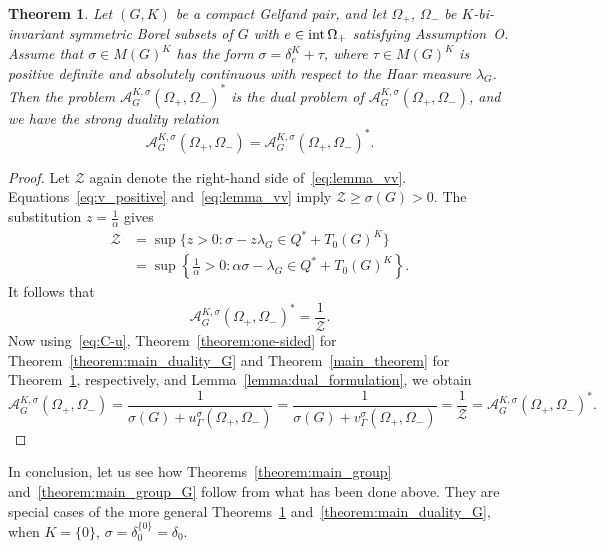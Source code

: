 \documentclass[[a4paper,english,12pt]{amsart}
\theoremstyle{plain}
\newtheorem{theorem}{Theorem}
\theoremstyle{remark}
\newcommand{\intt}{\mbox{\rm int\,}}
\begin{document}
\begin{theorem} \label{theorem:main_duality}
Let $(G,K)$ be a compact Gelfand pair, and let $\Omega_+$, $\Omega_-$ be $K$-bi-invariant symmetric Borel subsets of $G$ with $e \in \intt{\Omega_+}$ satisfying Assumption~O.  Assume that $\sigma\in M(G)^K$ has the form $\sigma = \delta_e^K + \tau $, where \(\tau \in M(G)^K\) is positive definite and absolutely continuous with respect to the Haar measure $\lambda_G$. Then the problem ${\mathcal{A}}^{K, \sigma}_G(\Omega_+, \Omega_-)^{*}$ is the dual problem of ${\mathcal{A}}^{K, \sigma}_G(\Omega_+, \Omega_-)$, and we have the strong duality relation
\begin{equation*}
   {\mathcal{A}}^{K, \sigma}_G(\Omega_+, \Omega_-) = {\mathcal{A}}^{K, \sigma}_G(\Omega_+, \Omega_-)^{*}.
\end{equation*}
\end{theorem}

\begin{proof} 
Let $\mathcal{Z}$ again denote the right-hand side of~\eqref{eq:lemma_vv}. Equations~\eqref{eq:v_positive} and~\eqref{eq:lemma_vv} imply $\mathcal{Z} \ge \sigma(G) > 0$. The substitution $z = \frac{1}{\alpha}$ gives
\begin{align*}
\mathcal{Z}
& = \sup\{ z > 0 : \sigma - z\lambda_G \in Q^* + T_0(G)^K \} \\
& = \sup\left\{ \frac{1}{\alpha} > 0 : \alpha \sigma - \lambda_G \in Q^* + T_0(G)^K \right\}.
\end{align*}
It follows that
$$
{\mathcal{A}}^{K, \sigma}_G(\Omega_+, \Omega_-)^{*} = \frac{1}{\mathcal{Z}}.
$$
Now using~\eqref{eq:C-u}, Theorem~\ref{theorem:one-sided} for Theorem~\ref{theorem:main_duality_G} and Theorem~\ref{main_theorem} for Theorem~\ref{theorem:main_duality}, respectively, and Lemma~\ref{lemma:dual_formulation}, we obtain
$$
{\mathcal{A}}^{K, \sigma}_G(\Omega_+, \Omega_-) = \frac{1}{\sigma(G) + u_\Gamma^\sigma(\Omega_+, \Omega_-)}
= \frac{1}{\sigma(G) + v_\Gamma^\sigma(\Omega_+, \Omega_-)} = \frac{1}{\mathcal{Z}} = {\mathcal{A}}^{K, \sigma}_G(\Omega_+, \Omega_-)^{*}.
$$

\end{proof}


In conclusion, let us see how Theorems~\ref{theorem:main_group} and~\ref{theorem:main_group_G} follow from what has been done above. They are special cases of the more general Theorems~\ref{theorem:main_duality} and~\ref{theorem:main_duality_G}, when $K=\{0\}$, $\sigma = \delta_0^{\{0\}} = \delta_0$. 
\end{document}
